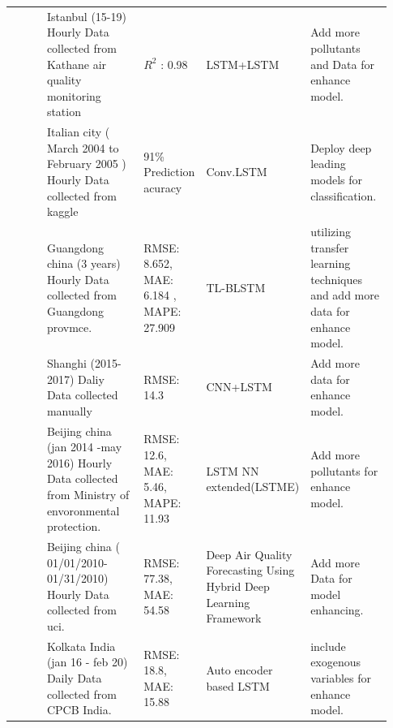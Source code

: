 \documentclass[a4paper, fleqn]{cas-sc}
\theoremstyle{definition}
\theoremstyle{remark}
\begin{document}
\begin{landscape}
{\begin{longtable}[h!]{ p{0.12\linewidth} p{0.27\linewidth} p{0.16\linewidth} p{0.16\linewidth} p{0.22\linewidth} }
 \cite{eren2023predicting}         & Istanbul (15-19) Hourly Data   collected from Kathane air quality monitoring station                     & $R^2$ :  0.98                                                                                               & LSTM+LSTM                                                           & Add more pollutants and Data for enhance model.           \\
\cite{zhu2023deep}           & Italian city ( March 2004 to   February 2005 ) Hourly Data collected from kaggle                         & 91\% Prediction acuracy                                                                                 & Conv.LSTM                                                           & Deploy deep leading models for classification.  \\
 \cite{ma2019improving}               & Guangdong china (3 years) Hourly   Data collected from Guangdong  provmce.                               & RMSE: 8.652,  MAE: 6.184 ,    MAPE: 27.909                                                                   & TL-BLSTM                                                            & utilizing transfer learning techniques and add more data for enhance model.     \\
\cite{qin2019novel}       & Shanghi (2015-2017) Daliy Data collected   manually  & RMSE:  14.3   & CNN+LSTM     &  Add more data for enhance model. \\
 \cite{li2017long}          & Beijing china (jan 2014 -may   2016) Hourly Data collected from Ministry of envoronmental protection.    & RMSE: 12.6,  MAE: 5.46,  MAPE:  11.93                                                                        & LSTM NN extended(LSTME)                                             & Add more pollutants for enhance model.                                           \\
 \cite{du2019deep}         & Beijing china (   01/01/2010-01/31/2010) Hourly Data collected from uci.                                 & RMSE: 77.38,  MAE: 54.58                                                                                   & Deep Air Quality Forecasting   Using Hybrid Deep Learning Framework & Add more Data for model enhancing.\\
\cite{nath2021long}       & Kolkata India (jan 16 - feb   20)  Daily Data collected from CPCB   India.                               & RMSE: 18.8,  MAE: 15.88                                                                                    & Auto encoder based LSTM                                             &  include exogenous variables for enhance model. \\ \hline
  \end{longtable}}
  \end{landscape}
\end{document}
